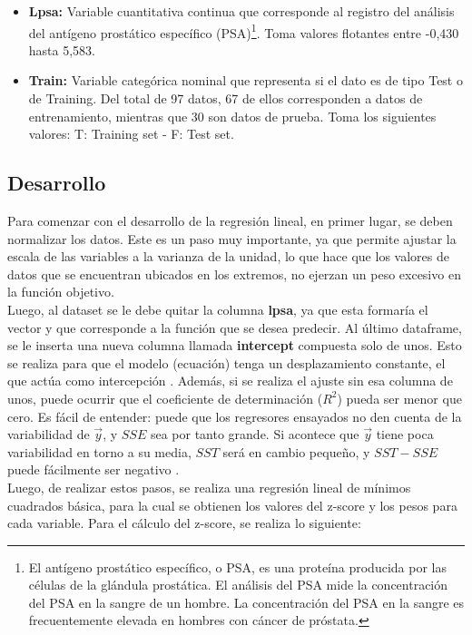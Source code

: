 \documentclass[letter, 10pt]{article}
\begin{document}
\begin{itemize}
\item \textbf{Lpsa: }Variable cuantitativa continua que corresponde al registro del análisis del antígeno prostático específico (PSA)\footnote{El antígeno prostático específico, o PSA, es una proteína producida por las células de la glándula prostática. El análisis del PSA mide la concentración del PSA en la sangre de un hombre. La concentración del PSA en la sangre es frecuentemente elevada en hombres con cáncer de próstata.}. Toma valores flotantes entre -0,430 hasta 5,583.
\item \textbf{Train: }Variable categórica nominal que representa si el dato es de tipo Test o de Training. Del total de 97 datos, 67 de ellos corresponden a datos de entrenamiento, mientras que 30 son datos de prueba. Toma los siguientes valores: T: Training set - F: Test set.
\end{itemize}

\subsection{Desarrollo}
Para comenzar con el desarrollo de la regresión lineal, en primer lugar, se deben normalizar los datos. Este es un paso muy importante, ya que permite ajustar la escala de las variables a la varianza de la unidad, lo que hace que los valores de datos que se encuentran ubicados en los extremos, no ejerzan un peso excesivo en la función objetivo.\\

Luego, al dataset se le debe quitar la columna \textbf{lpsa}, ya que esta formaría el vector y que corresponde a la función que se desea predecir. Al último dataframe, se le inserta una nueva columna llamada \textbf{intercept} compuesta solo de unos. Esto se realiza para que el modelo (ecuación) tenga un desplazamiento constante, el que actúa como intercepción \cite{P2}. Además, si se realiza el ajuste sin esa columna de unos, puede ocurrir que el coeficiente de determinación ($R^2$) pueda ser menor que cero. Es fácil de entender: puede que los regresores ensayados no den cuenta de la variabilidad de $\vec{y}$, y $SSE$ sea por tanto grande. Si acontece que $\vec{y}$ tiene poca variabilidad en torno a su media, $SST$ será en cambio pequeño, y $SST-SSE$ puede fácilmente ser negativo \cite{P1}.\\

Luego, de realizar estos pasos, se realiza una regresión lineal de mínimos cuadrados básica, para la cual se obtienen los valores del z-score y los pesos para cada variable. Para el cálculo del z-score, se realiza lo siguiente:
\end{document}
